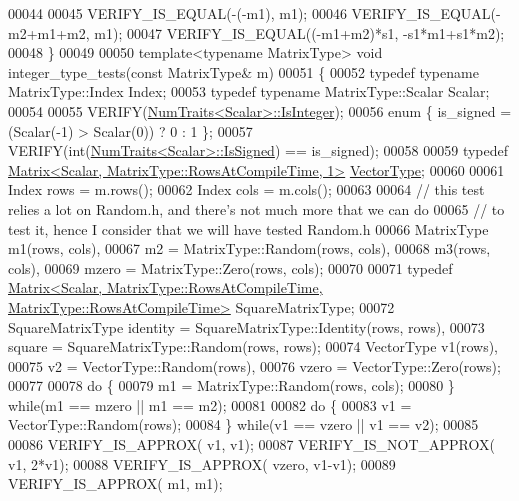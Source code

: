 \begin{DoxyCode}
00044 
00045   VERIFY\_IS\_EQUAL(-(-m1),                  m1);
00046   VERIFY\_IS\_EQUAL(-m2+m1+m2,               m1);
00047   VERIFY\_IS\_EQUAL((-m1+m2)*s1,             -s1*m1+s1*m2);
00048 \}
00049 
00050 \textcolor{keyword}{template}<\textcolor{keyword}{typename} MatrixType> \textcolor{keywordtype}{void} integer\_type\_tests(\textcolor{keyword}{const} MatrixType& m)
00051 \{
00052   \textcolor{keyword}{typedef} \textcolor{keyword}{typename} MatrixType::Index Index;
00053   \textcolor{keyword}{typedef} \textcolor{keyword}{typename} MatrixType::Scalar Scalar;
00054 
00055   VERIFY(\hyperlink{group___core___module_struct_eigen_1_1_num_traits}{NumTraits<Scalar>::IsInteger});
00056   \textcolor{keyword}{enum} \{ is\_signed = (Scalar(-1) > Scalar(0)) ? 0 : 1 \};
00057   VERIFY(\textcolor{keywordtype}{int}(\hyperlink{group___core___module_struct_eigen_1_1_num_traits}{NumTraits<Scalar>::IsSigned}) == is\_signed);
00058 
00059   \textcolor{keyword}{typedef} \hyperlink{group___core___module_class_eigen_1_1_matrix}{Matrix<Scalar, MatrixType::RowsAtCompileTime, 1>} 
      \hyperlink{struct_vector_type}{VectorType};
00060 
00061   Index rows = m.rows();
00062   Index cols = m.cols();
00063 
00064   \textcolor{comment}{// this test relies a lot on Random.h, and there's not much more that we can do}
00065   \textcolor{comment}{// to test it, hence I consider that we will have tested Random.h}
00066   MatrixType m1(rows, cols),
00067              m2 = MatrixType::Random(rows, cols),
00068              m3(rows, cols),
00069              mzero = MatrixType::Zero(rows, cols);
00070 
00071   \textcolor{keyword}{typedef} 
      \hyperlink{group___core___module_class_eigen_1_1_matrix}{Matrix<Scalar, MatrixType::RowsAtCompileTime, MatrixType::RowsAtCompileTime>}
       SquareMatrixType;
00072   SquareMatrixType identity = SquareMatrixType::Identity(rows, rows),
00073                    square = SquareMatrixType::Random(rows, rows);
00074   VectorType v1(rows),
00075              v2 = VectorType::Random(rows),
00076              vzero = VectorType::Zero(rows);
00077 
00078   \textcolor{keywordflow}{do} \{
00079     m1 = MatrixType::Random(rows, cols);
00080   \} \textcolor{keywordflow}{while}(m1 == mzero || m1 == m2);
00081 
00082   \textcolor{keywordflow}{do} \{
00083     v1 = VectorType::Random(rows);
00084   \} \textcolor{keywordflow}{while}(v1 == vzero || v1 == v2);
00085 
00086   VERIFY\_IS\_APPROX(               v1,    v1);
00087   VERIFY\_IS\_NOT\_APPROX(           v1,    2*v1);
00088   VERIFY\_IS\_APPROX(               vzero, v1-v1);
00089   VERIFY\_IS\_APPROX(               m1,    m1);

\end{DoxyCode}
